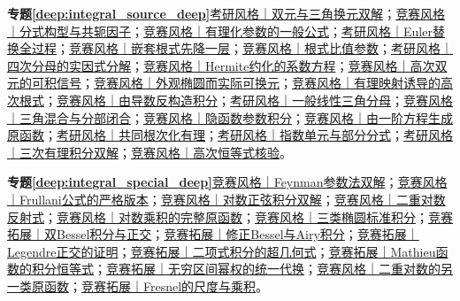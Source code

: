 \par\noindent\textbf{专题\ref{deep:integral_source_deep}}\quad \hyperref[deep:ex:integral_source_deep:dual1]{考研风格｜双元与三角换元双解}；\hyperref[deep:ex:integral_source_deep:dual2]{竞赛风格｜分式构型与共轭因子}；\hyperref[deep:ex:integral_source_deep:dual3]{竞赛风格｜有理化参数的一般公式}；\hyperref[deep:ex:integral_source_deep:euler1]{考研风格｜Euler替换全过程}；\hyperref[deep:ex:integral_source_deep:nested]{竞赛风格｜嵌套根式先降一层}；\hyperref[deep:ex:integral_source_deep:rootratio]{竞赛风格｜根式比值参数}；\hyperref[deep:ex:integral_source_deep:quartic]{考研风格｜四次分母的实因式分解}；\hyperref[deep:ex:integral_source_deep:hermite]{竞赛风格｜Hermite约化的系数方程}；\hyperref[deep:ex:integral_source_deep:binomial]{竞赛风格｜高次双元的可积信号}；\hyperref[deep:ex:integral_source_deep:pseudo1]{竞赛风格｜外观椭圆而实际可换元}；\hyperref[deep:ex:integral_source_deep:pseudo2]{竞赛风格｜有理映射诱导的高次根式}；\hyperref[deep:ex:integral_source_deep:exactalg]{竞赛风格｜由导数反构造积分}；\hyperref[deep:ex:integral_source_deep:triglinear]{考研风格｜一般线性三角分母}；\hyperref[deep:ex:integral_source_deep:trigmix]{竞赛风格｜三角混合与分部闭合}；\hyperref[deep:ex:integral_source_deep:implicit]{竞赛风格｜隐函数参数积分}；\hyperref[deep:ex:integral_source_deep:odeint]{竞赛风格｜由一阶方程生成原函数}；\hyperref[deep:ex:integral_source_deep:lcmroot]{考研风格｜共同根次化有理}；\hyperref[deep:ex:integral_source_deep:expunit]{考研风格｜指数单元与部分分式}；\hyperref[deep:ex:integral_source_deep:cubic]{考研风格｜三次有理积分双解}；\hyperref[deep:ex:integral_source_deep:pellcase]{竞赛风格｜高次恒等式核验}。\par
\par\noindent\textbf{专题\ref{deep:integral_special_deep}}\quad \hyperref[deep:ex:integral_special_deep:arctanparam]{竞赛风格｜Feynman参数法双解}；\hyperref[deep:ex:integral_special_deep:frullani]{竞赛风格｜Frullani公式的严格版本}；\hyperref[deep:ex:integral_special_deep:logsin]{竞赛风格｜对数正弦积分双解}；\hyperref[deep:ex:integral_special_deep:dilog]{竞赛风格｜二重对数反射式}；\hyperref[deep:ex:integral_special_deep:logproduct]{竞赛风格｜对数乘积的完整原函数}；\hyperref[deep:ex:integral_special_deep:elliptic3]{竞赛风格｜三类椭圆标准积分}；\hyperref[deep:ex:integral_special_deep:besselpair]{竞赛拓展｜双Bessel积分与正交}；\hyperref[deep:ex:integral_special_deep:modified]{竞赛拓展｜修正Bessel与Airy积分}；\hyperref[deep:ex:integral_special_deep:legendreproof]{竞赛拓展｜Legendre正交的证明}；\hyperref[deep:ex:integral_special_deep:hypergeneral]{竞赛拓展｜二项式积分的超几何式}；\hyperref[deep:ex:integral_special_deep:mathieu]{竞赛拓展｜Mathieu函数的积分恒等式}；\hyperref[deep:ex:integral_special_deep:incompletebeta]{竞赛拓展｜无穷区间幂权的统一代换}；\hyperref[deep:ex:integral_special_deep:logplus]{竞赛风格｜二重对数的另一类原函数}；\hyperref[deep:ex:integral_special_deep:fresnelprimitive]{竞赛拓展｜Fresnel的尺度与乘积}。\par
